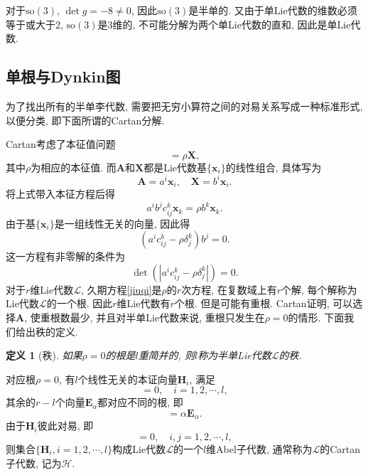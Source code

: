 \documentclass[UTF8]{ctexart}
\newtheorem{define}{定义}
\begin{document}
对于$\mathrm{so}(3)$, $\det g = -8 \neq 0$, 因此$\mathrm{so}(3)$是半单的. 又由于单Lie代数的维数必须等于或大于2, $\mathrm{so}(3)$是3维的, 不可能分解为两个单Lie代数的直和, 因此是单Lie代数.

\subsection{单根与Dynkin图}
为了找出所有的半单李代数, 需要把无穷小算符之间的对易关系写成一种标准形式, 以便分类, 即下面所谓的Cartan分解. 

Cartan考虑了本征值问题
\begin{equation}
  [\bm{A}, \bm{X}] = \rho \bm{X}, 
\end{equation}
其中$\rho$为相应的本征值. 而$\bm{A}$和$\bm{X}$都是Lie代数基$\{\bm{x}_i\}$的线性组合, 具体写为
\begin{equation}
  \bm{A} = a^i\bm{x}_i, \quad \bm{X} = b^i \bm{x}_i.
\end{equation}
将上式带入本征方程后得
\begin{equation}
  a^i b^j c_{ij}^k \bm{x}_k = \rho b^k \bm{x}_k.
\end{equation}
由于基$\{\bm{x}_i\}$是一组线性无关的向量, 因此得
\begin{equation}
  (a^i c_{ij}^k - \rho \delta_j^k)b^j = 0.
\end{equation}
这一方程有非零解的条件为
\begin{equation}\label{jiuqi}
  \det (|a^i c_{ij}^k - \rho \delta_j^k|) = 0.
\end{equation}
对于$r$维Lie代数$\mathcal{L}$, 久期方程\eqref{jiuqi}是$\rho$的$r$次方程, 在复数域上有$r$个解, 每个解称为Lie代数$\mathcal{L}$的一个根. 因此$r$维Lie代数有$r$个根. 但是可能有重根. Cartan证明, 可以选择$\bm{A}$, 使重根数最少, 并且对半单Lie代数来说, 重根只发生在$\rho = 0$的情形. 下面我们给出秩的定义.
\begin{define}[秩]
  如果$\rho=0$的根是$l$重简并的, 则$l$称为半单Lie代数$\mathcal{L}$的秩.
\end{define}

对应根$\rho = 0$, 有$l$个线性无关的本证向量$\bm{H}_i$, 满足
\begin{equation}
  [\bm{A}, \bm{H}_i] = 0, \quad i = 1, 2, \cdots, l,
\end{equation}
其余的$r-l$个向量$\bm{E}_\alpha$都对应不同的根, 即
\begin{equation}
  [\bm{A}, \bm{E}_\alpha] = \alpha \bm{E}_\alpha.
\end{equation}
由于$\bm{H}_i$彼此对易, 即
\begin{equation}
  [\bm{H}_i, \bm{H}_j] = 0, \quad i,j = 1, 2, \cdots, l,
\end{equation}
则集合$\{\bm{H}_i, i = 1, 2, \cdots, l\}$构成Lie代数$\mathcal{L}$的一个$l$维Abel子代数, 通常称为$\mathcal{L}$的Cartan子代数, 记为$\mathcal{H}$.
\end{document}
